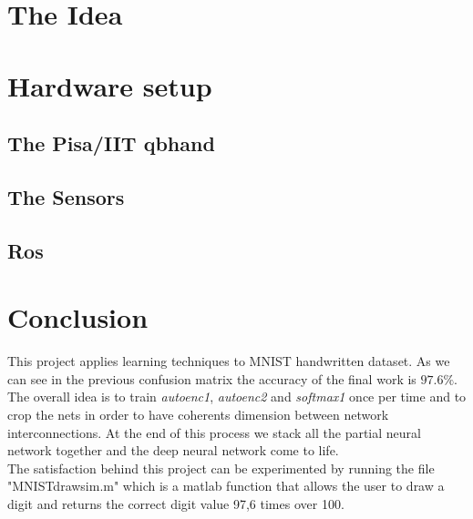 \section{}
\chapter{The Idea}
\chapter{Hardware setup}
\section{The Pisa/IIT qbhand}
\section{The Sensors}
\section{}
\section{Ros}


\chapter*{Conclusion}
This project applies learning \cite{art:rif.1} techniques to MNIST handwritten dataset. As we can see in the previous confusion matrix the accuracy of the final work is $97.6\%$. The overall idea is to train \emph{autoenc1},  \emph{autoenc2} and \emph{softmax1} once per time and to crop the nets in order to have coherents dimension between network interconnections. At the end of \cite{book:rif.2}this process we stack all the partial neural network together and the deep neural network come to life. \\The satisfaction behind this project can be experimented by running the file "MNIST\textunderscore drawsim.m" which is a matlab function that allows the user to draw a digit and returns the correct digit value 97,6 times over 100.